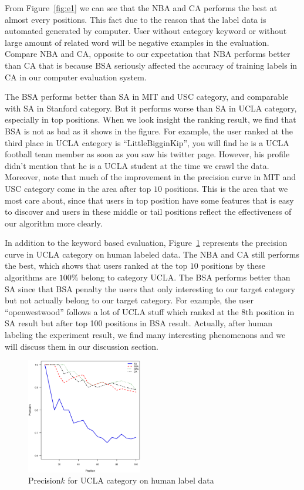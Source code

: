 \documentclass{article}
\begin{document}
From Figure~\ref{fig:e1} we can see that the NBA and CA performs the best at almost every positions. This fact due to the reason that the label data is automated generated by computer. User without category keyword or without large amount of related word will be negative examples in the evaluation. Compare NBA and CA, opposite to our expectation that NBA performs better than CA that is because BSA seriously affected the accuracy of training labels in CA in our computer evaluation system.

The BSA performs better than SA in MIT and USC category, and comparable with SA in Stanford category. But it performs worse than SA in UCLA category, especially in top positions. When we look insight the ranking result, we find that BSA is not as bad as it shows in the figure. For example, the user ranked at the third place in UCLA category is ``LittleBigginKip'', you will find he is a UCLA football team member as soon as you saw his twitter page. However, his profile didn't mention that he is a UCLA student at the time we crawl the data. Moreover, note that much of the improvement in the precision curve in MIT and USC category come in the area after top $10$ positions. This is the area that we most care about, since that users in top position have some features that is easy to discover and users in these middle or tail positions reflect the effectiveness of our algorithm more clearly.

In addition to the keyword based evaluation, Figure~\ref{fig:e2} represents the precision curve in UCLA category on human labeled data. The NBA and CA still performs the best, which shows that users ranked at the top $10$ positions by these algorithms are $100\%$ belong to category UCLA. The BSA performs better than SA since that BSA penalty the users that only interesting to our target category but not actually belong to our target category. For example, the user ``openwestwood'' follows a lot of UCLA stuff which ranked at the $8$th position in SA result but after top 100 positions in BSA result. Actually, after human labeling the experiment result, we find many interesting phenomenons and we will discuss them in our discussion section.
\begin{figure}[htbp]
\centering
\includegraphics[width=0.45\textwidth]{experiment/e1.ucla.pool.eps}
\caption{Precision\at$k$ for UCLA category on human label data}
\label{fig:e2}
\end{figure}
\end{document}
